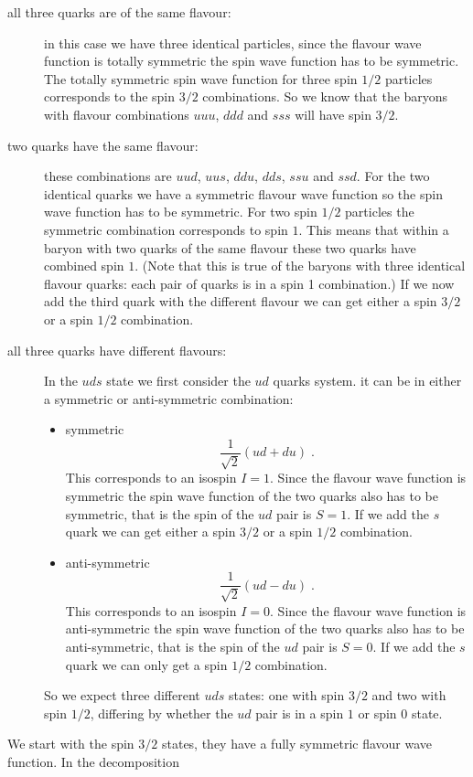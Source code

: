 \documentclass[12pt]{article}
\begin{document}
\begin{description}
\item[all three quarks are of the same flavour:] in this case we have three identical particles, since the flavour wave function is totally symmetric the spin wave function has to be symmetric. The totally symmetric spin wave function for three spin $1/2$ particles corresponds to the spin $3/2$ combinations. So we know that the baryons with flavour combinations $uuu$, $ddd$ and $sss$ will have spin $3/2$.
\item[two quarks have the same flavour:] these combinations are $uud$, $uus$, $ddu$, $dds$, $ssu$ and $ssd$. For the two identical quarks we have a symmetric flavour wave function so the spin wave function has to be symmetric. For two spin $1/2$ particles the symmetric combination corresponds to spin $1$. This means that within a baryon with two quarks of the same flavour these two quarks have combined spin $1$. (Note that this is true of the baryons with three identical flavour quarks: each pair of quarks is in a spin 1 combination.) If we now add the third quark with the different flavour we can get either a spin $3/2$ or a spin $1/2$ combination.
\item[all three quarks have different flavours:] In the $uds$ state we first consider the $ud$ quarks system. it can be in either a symmetric or anti-symmetric combination:
\begin{itemize}
\item symmetric 
\[\frac{1}{\sqrt2}\left(ud+du\right)\;.\]
This corresponds to an isospin $I=1$. Since the flavour wave function is symmetric the spin wave function of the two quarks also has to be symmetric, that is the spin of the $ud$ pair is $S=1$. If we add the $s$ quark we can get either a spin $3/2$ or a spin $1/2$ combination.
\item anti-symmetric 
\[\frac{1}{\sqrt2}\left(ud-du\right)\;.\]
This corresponds to an isospin $I=0$. Since the flavour wave function is anti-symmetric the spin wave function of the two quarks also has to be anti-symmetric, that is the spin of the $ud$ pair is $S=0$. If we add the $s$ quark we can only get a spin $1/2$ combination.
\end{itemize}
So we expect three different $uds$ states: one with spin $3/2$ and two with spin $1/2$, differing by whether the $ud$  pair is in a spin $1$ or spin $0$ state.
\end{description}
We start with the spin $3/2$ states, they have a fully symmetric flavour wave function. In the decomposition 
\end{document}
